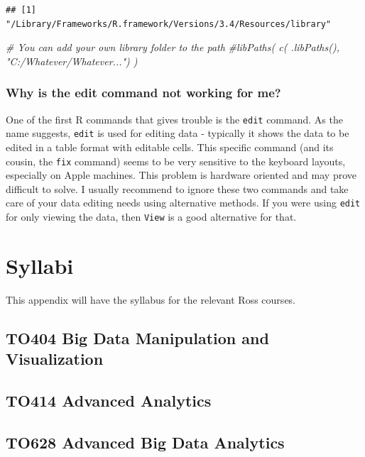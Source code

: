 \documentclass[]{krantz}
\makeatletter
\newenvironment{Shaded}{\begin{snugshade}}{\end{snugshade}}
\newcommand{\CommentTok}[1]{\textcolor[rgb]{0.56,0.35,0.01}{\textit{#1}}}
\newenvironment{kframe}{%
\medskip{}
\setlength{\fboxsep}{.8em}
 \def\at@end@of@kframe{}%
 \ifinner\ifhmode%
  \def\at@end@of@kframe{\end{minipage}}%
  \begin{minipage}{\columnwidth}%
 \fi\fi%
 \def\FrameCommand##1{\hskip\@totalleftmargin \hskip-\fboxsep
 \colorbox{shadecolor}{##1}\hskip-\fboxsep
     \hskip-\linewidth \hskip-\@totalleftmargin \hskip\columnwidth}%
 \MakeFramed {\advance\hsize-\width
   \@totalleftmargin\z@ \linewidth\hsize
   \@setminipage}}%
 {\par\unskip\endMakeFramed%
 \at@end@of@kframe}
\renewenvironment{Shaded}{\begin{kframe}}{\end{kframe}}
\theoremstyle{definition}
\theoremstyle{definition}
\theoremstyle{definition}
\theoremstyle{remark}
\makeatother
\begin{document}
\begin{verbatim}
## [1] "/Library/Frameworks/R.framework/Versions/3.4/Resources/library"
\end{verbatim}

\begin{Shaded}
\begin{Highlighting}[]
\CommentTok{# You can add your own library folder to the path}
\CommentTok{#libPaths( c( .libPaths(), "C:/Whatever/Whatever...") )}
\end{Highlighting}
\end{Shaded}

\subsection{Why is the edit command not working for
me?}\label{why-is-the-edit-command-not-working-for-me}

One of the first R commands that gives trouble is the \texttt{edit}
command. As the name suggests, \texttt{edit} is used for editing data -
typically it shows the data to be edited in a table format with editable
cells. This specific command (and its cousin, the \texttt{fix} command)
seems to be very sensitive to the keyboard layouts, especially on Apple
machines. This problem is hardware oriented and may prove difficult to
solve. I usually recommend to ignore these two commands and take care of
your data editing needs using alternative methods. If you were using
\texttt{edit} for only viewing the data, then \texttt{View} is a good
alternative for that.

\cleardoublepage 

\appendix {}


\chapter{Syllabi}\label{syllabi}

This appendix will have the syllabus for the relevant Ross courses.

\section{TO404 Big Data Manipulation and
Visualization}\label{to404-big-data-manipulation-and-visualization}

\section{TO414 Advanced Analytics}\label{to414-advanced-analytics}

\section{TO628 Advanced Big Data
Analytics}\label{to628-advanced-big-data-analytics}



\backmatter
\printindex
\end{document}
